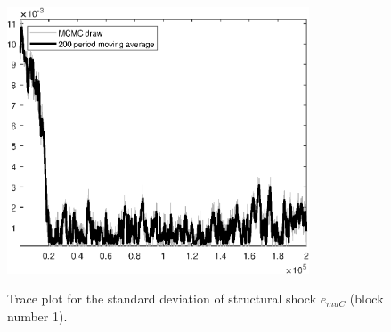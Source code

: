 \begin{figure}[H]
\centering
  \includegraphics[width=0.8\textwidth]{BRS_sectoral_rest/graphs/TracePlot_SE_e_muC_blck_1}\\
    \caption{Trace plot for the standard deviation of structural shock ${e_{muC}}$ (block number 1).}
\end{figure}
